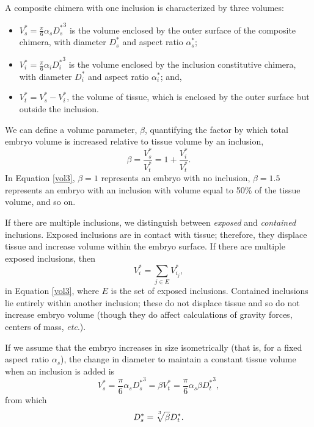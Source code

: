 \documentclass[10pt,a4paper]{article}
\def\etc{\emph{etc}.\xspace}
\begin{document}
A composite chimera with one inclusion is characterized by three volumes:
\begin{itemize}
	\item $V_s^* = \frac{\pi}{6} \alpha_s {D_s^*}^3$ is the volume enclosed by the outer surface of the composite chimera, with diameter $D_s^*$ and aspect ratio $\alpha_s^*$;
	\item $V_i^* = \frac{\pi}{6} \alpha_i {D_i^*}^3$ is the volume enclosed by the inclusion constitutive chimera, with diameter $D_i^*$ and aspect ratio $\alpha_i^*$; and,
	\item $V_t^* = V_s^* - V_i^*$, the volume of tissue, which is enclosed by the outer surface but outside the inclusion. 
\end{itemize}
We can define a volume parameter, $\beta$, quantifying the factor by which total embryo volume is increased relative to tissue volume by an inclusion,
\begin{equation}\label{vol3}
	\beta = \frac{V_s^*}{V_t^*} = 1 + \frac{V_i^*}{V_t^*}.
\end{equation}
In Equation \ref{vol3}, $\beta = 1$ represents an embryo with no inclusion, $\beta = 1.5$ represents an embryo with an inclusion with volume equal to 50\% of the tissue volume, and so on.

If there are multiple inclusions, we distinguish between \textit{exposed} and \textit{contained} inclusions. 
Exposed inclusions are in contact with tissue; therefore, they displace tissue and increase volume within the embryo surface.  
If there are multiple exposed inclusions, then 
\begin{equation}\label{eqn:expincl}
	V_i^* = \sum_{j \in E} V^*_{i_j},
\end{equation}
in  Equation \ref{vol3}, where $E$ is the set of exposed inclusions.
Contained inclusions lie entirely within another inclusion; these do not displace tissue and so do not increase embryo volume (though they do affect calculations of gravity forces, centers of mass, \etc).


If we assume that the embryo increases in size isometrically (that is, for a fixed aspect ratio $\alpha_s$), the change in diameter to maintain a constant tissue volume when an inclusion is added is
\begin{equation}\label{vol4}
	V_s^*  = \frac{\pi}{6} \alpha_s {D_s^*}^3 = \beta V_t^* = \frac{\pi}{6} \alpha_s \beta {D_t^*}^3,
\end{equation} 
from which 
\begin{equation}\label{vol5}
	D_s^* = \sqrt[\uproot{5}3]{\beta} D_t^*.
\end{equation}
\end{document}
